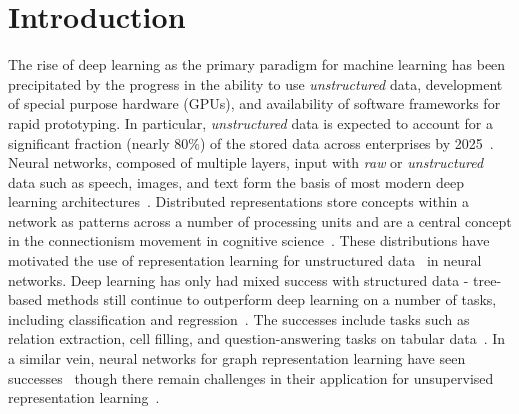 
\chapter{Introduction}

The rise of deep learning as the primary paradigm for machine learning has been precipitated by the progress in the ability to use \textit{unstructured} data, development of special purpose hardware (GPUs), and availability of software frameworks for rapid prototyping.
In particular, \textit{unstructured} data is expected to account for a significant fraction (nearly 80\%) of the stored data across enterprises by 2025~\citep{rydning2018digitization}. 
Neural networks, composed of multiple layers, input with \textit{raw} or \textit{unstructured} data such as speech, images, and text form the basis of most modern deep learning architectures~\cite{lecun2015deep}.
Distributed representations store concepts within a network as patterns across a number of processing units and are a central concept in the connectionism movement in cognitive science~\citep{hinton1986distributed}.
These distributions have motivated the use of representation learning for unstructured data~\citep{goodfellow2016deep,lecun2015deep} in neural networks.
Deep learning has only had mixed success with structured data - 
tree-based methods still continue to outperform deep learning on a number of tasks, including classification and regression~\citep{shwartz2022tabular,grinsztajn2022tree}. 
The successes include tasks such as relation extraction, cell filling, and question-answering tasks on tabular data~\cite{deng2022turl}. 
In a similar vein, neural networks for graph representation learning have seen successes~\cite{welling2016semi,velivckovic2018graph} though there remain challenges in their application for unsupervised representation learning~\citep{gurukar2022benchmarking}.

